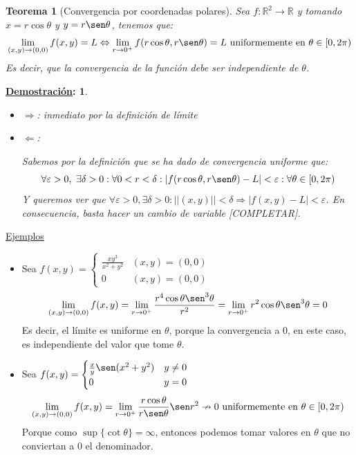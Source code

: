 \documentclass[10pt,a4paper,openright]{book}
\theoremstyle{break}
\newtheorem*{theo}{Teorema}
\newtheorem*{demo}{\underline{Demostración}:}
\begin{document}
\begin{theo}[Convergencia por coordenadas polares]
Sea $f: \mathbb{R}^2 \to \mathbb{R}$ y tomando $x=r\cos\theta$ y $y=r \sen\theta$, tenemos que:
$$\lim_{(x,y) \to (0,0)} f(x,y) = L \Leftrightarrow \lim_{r \to 0^+} f(r \cos\theta,r \sen\theta) = L \mbox{ uniformemente en } \theta \in [0, 2\pi)$$
Es decir, que la convergencia de la función debe ser independiente de $\theta$.
\end{theo}

\begin{demo}
\begin{itemize}
\item $\Rightarrow$: inmediato por la definición de límite
\item $\Leftarrow$:

Sabemos por la definición que se ha dado de convergencia uniforme que:
$$\forall \varepsilon > 0 ,\ \exists \delta > 0 :  \forall 0 < r < \delta: |f(r \cos\theta,r \sen\theta) - L| < \varepsilon : \forall \theta \in [0,2\pi)$$
Y queremos ver que $\forall \varepsilon > 0, \exists \delta > 0 : ||(x,y)|| < \delta \Rightarrow |f(x,y) - L| < \varepsilon$. En consecuencia, basta hacer un cambio de variable [COMPLETAR].
\end{itemize}
\end{demo}

\underline{Ejemplos}
\begin{itemize}
\item Sea $f(x,y)= \begin{cases} \frac{xy^3}{x^2  + y^2} & (x,y) = (0,0) \\ 0 & (x,y) = (0,0) \end{cases}$
$$\lim_{(x,y) \to (0,0)} f(x,y) = \lim_{r \to 0^+} \frac{r^4 \cos\theta \sen^3 \theta}{r^2} = \lim_{r \to 0^+} r^2 \cos\theta \sen^3 \theta = 0$$
Es decir, el límite es uniforme en $\theta$, porque la convergencia a 0, en este caso, es independiente del valor que tome $\theta$.
\item Sea $f(x,y) = \begin{cases} \frac{x}{y} \sen (x^2 + y^2) & y \neq 0 \\ 0 & y = 0 \end{cases}$
$$\lim_{(x,y) \to (0,0)} f(x,y) = \lim_{r \to 0^+} \frac{r \cos\theta}{r \sen\theta} \sen r^2 \nrightarrow 0 \mbox{ uniformemente en } \theta \in [0,2\pi)$$
Porque como $\sup \{\cot \theta\} = \infty$, entonces podemos tomar valores en $\theta$ que no conviertan a 0 el denominador.
\end{itemize}
\end{document}
